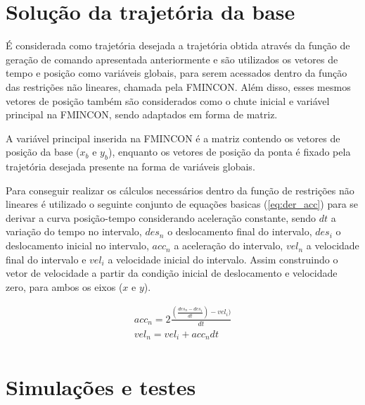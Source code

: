 \section{Solução da trajetória da base}

É considerada como trajetória desejada a trajetória obtida através da função de geração de comando apresentada anteriormente
e são utilizados os vetores de tempo e posição como variáveis globais, para serem acessados dentro da função das
restrições não lineares, chamada pela FMINCON.
Além disso, esses mesmos vetores de posição também são considerados como o chute inicial e variável principal
na FMINCON, sendo adaptados em forma de matriz.

A variável principal inserida na FMINCON é a matriz contendo os vetores de posição da base ($x_b$ e $y_b$),
enquanto os vetores de posição da ponta é fixado pela trajetória desejada presente na forma de variáveis globais.

Para conseguir realizar os cálculos necessários dentro da função de restrições não lineares é utilizado o seguinte conjunto
de equações basicas (\ref{eq:der_acc}) para se derivar a curva posição-tempo considerando aceleração constante,
sendo $dt$ a variação do tempo no intervalo, $des_n$ o deslocamento final do intervalo, $des_i$ o deslocamento inicial no intervalo,
$acc_n$ a aceleração do intervalo, $vel_n$ a velocidade final do intervalo e $vel_i$ a velocidade inicial do intervalo.
Assim construindo o vetor de velocidade a partir da condição inicial de deslocamento e velocidade zero, para ambos os eixos ($x$ e $y$).

\begin{equation}
    \label{eq:der_acc}
    \begin{split}        
        acc_n = 2\frac{(\frac{des_n-des_i}{dt})-vel_i)}{dt} \\
        vel_n = vel_i+acc_ndt \\
    \end{split}
\end{equation}

\section{Simulações e testes}
